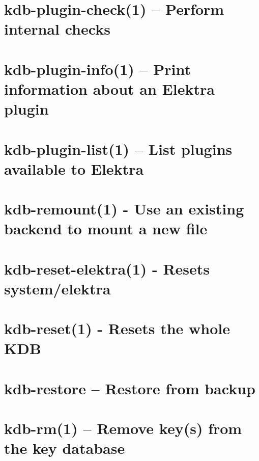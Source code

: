 \let\mypdfximage\pdfximage\def\pdfximage{\immediate\mypdfximage}\documentclass[twoside]{book}
\newcommand{\+}{\discretionary{\mbox{\scriptsize$\hookleftarrow$}}{}{}}
\begin{document}
\chapter{kdb-\/plugin-\/check(1) -- Perform internal checks}
\label{doc_help_kdb-plugin-check_md}

\chapter{kdb-\/plugin-\/info(1) -- Print information about an Elektra plugin}
\label{doc_help_kdb-plugin-info_md}

\chapter{kdb-\/plugin-\/list(1) -- List plugins available to Elektra}
\label{doc_help_kdb-plugin-list_md}

\chapter{kdb-\/remount(1) -\/ Use an existing backend to mount a new file}
\label{doc_help_kdb-remount_md}

\chapter{kdb-\/reset-\/elektra(1) -\/ Resets system/elektra}
\label{doc_help_kdb-reset-elektra_md}

\chapter{kdb-\/reset(1) -\/ Resets the whole K\+DB}
\label{doc_help_kdb-reset_md}

\chapter{kdb-\/restore -- Restore from backup}
\label{doc_help_kdb-restore_md}

\chapter{kdb-\/rm(1) -- Remove key(s) from the key database}
\label{doc_help_kdb-rm_md}

\end{document}

